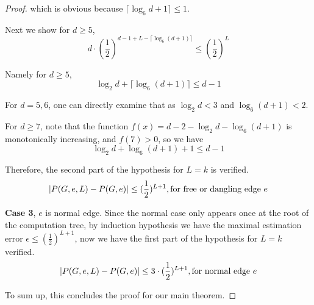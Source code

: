 \begin{proof}
		which is obvious because $\lceil\log_6{d+1}\rceil \leq 1$.

		Next we show for $d \geq 5$,
		\[ d\cdot \left( \frac{1}{2} \right)^{d-1 + L - \lceil \log_6{(d+1)}\rceil}  \leq \left( \frac{1}{2} \right)^L \]

		Namely for $d \geq 5$,
		\[ \log_2 d + \lceil \log_6{(d+1)} \rceil \leq d-1\]

		For $d=5,6$, one can directly examine that as $\log_2 d < 3$ and $\log_6 (d+1) < 2$.


		For $d\geq 7$, note that the function $f(x) = d-2 -\log_2 d - \log_6{(d+1)}$ is monotonically increasing, and $f(7)>0$, so we have 
        \[ \log_2 d + \log_6{(d+1)} + 1 \leq d-1\]

%
%
%
%

		Therefore, the second part of the hypothesis for $L=k$ is verified.
		\[\left\vert P(G,e,L) - P(G,e)\right\vert \leq (\frac{1}{2})^{L+1}, \textrm{for free or dangling edge $e$}\]

		{\bf Case 3}, $e$ is normal edge. Since the normal case only appears once at the root of the computation tree,
		by induction hypothesis we have the maximal estimation error $\epsilon \leq (\frac{1}{2})^{L+1}$,
		now we have the first part of the hypothesis for $L=k$ verified.
		\[\left\vert P(G,e,L) - P(G,e)\right\vert \leq 3\cdot(\frac{1}{2})^{L+1}, \textrm{for normal edge $e$}\]
		
		To sum up, this concludes the proof for our main theorem.
	\end{proof}
